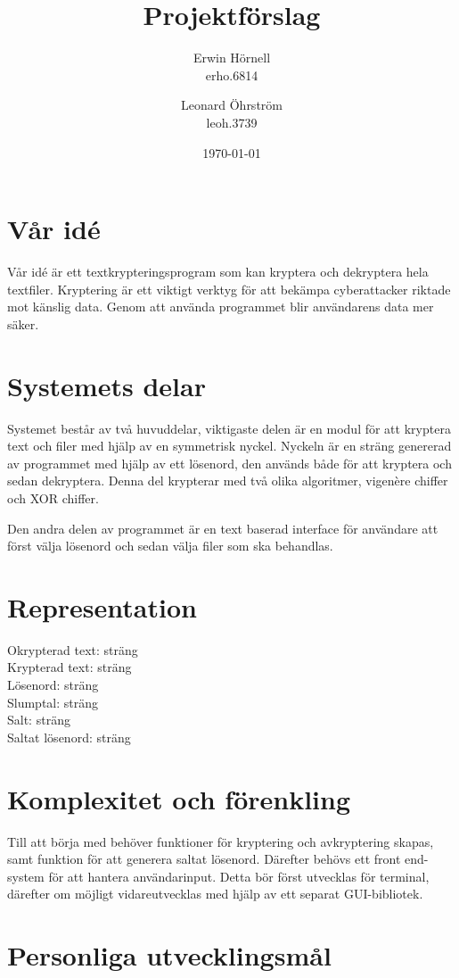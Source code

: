\documentclass[a4paper,12pt]{article}
\title{Projektförslag}
\author{
Erwin Hörnell \\
erho.6814
\and
Leonard Öhrström \\
leoh.3739
}
\date{\today}
\begin{document}
\maketitle
\newpage
\section{Vår idé}
Vår idé är ett textkrypteringsprogram som kan kryptera och dekryptera hela textfiler. Kryptering är ett viktigt verktyg för att bekämpa cyberattacker riktade mot känslig data. Genom att använda programmet blir användarens data mer säker.

\section{Systemets delar}
Systemet består av två huvuddelar, viktigaste delen är en modul för att kryptera text och filer med hjälp av en symmetrisk nyckel. Nyckeln är en sträng genererad av programmet med hjälp av ett lösenord, den används både för att kryptera och sedan dekryptera. Denna del krypterar med två olika algoritmer, vigenère chiffer och XOR chiffer.

Den andra delen av programmet är en text baserad interface för användare att först välja lösenord och sedan välja filer som ska behandlas.

\section{Representation}
Okrypterad text: sträng \\
Krypterad text: sträng \\
Lösenord: sträng \\
Slumptal: sträng \\
Salt: sträng \\
Saltat lösenord: sträng

\section{Komplexitet och förenkling}
Till att börja med behöver funktioner för kryptering och avkryptering skapas, samt funktion för att generera saltat lösenord. Därefter behövs ett front end-system för att hantera användarinput. Detta bör först utvecklas för terminal, därefter om möjligt vidareutvecklas med hjälp av ett separat GUI-bibliotek.

\section{Personliga utvecklingsmål}
\end{document}
